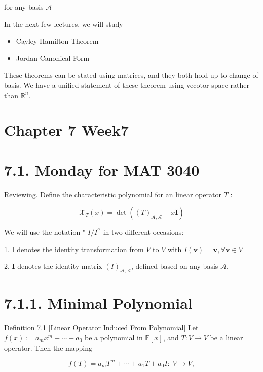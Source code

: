 \documentclass[11pt]{article}
\begin{document}
for any basis \(\mathcal{A}\)

In the next few lectures, we will study

\begin{itemize}
\item Cayley-Hamilton Theorem
\end{itemize}

\begin{itemize}
\item Jordan Canonical Form
\end{itemize}

These theorems can be stated using matrices, and they both hold up to change of basis. We have a unified statement of these theorem using vecotor space rather than \({\mathbb{R}}^n\).


\section*{Chapter 7 Week7}

\section*{7.1. Monday for MAT 3040}

Reviewing. Define the characteristic polynomial for an linear operator \(T\) :

\[
{\mathcal{X}}_{T}\left( x\right)  = \det \left( {{\left( T\right) }_{\mathcal{A},\mathcal{A}} - x\mathbf{I}}\right)
\]

We will use the notation " \(I/{I}^{\prime \prime }\) in two different occasions:

1. I denotes the identity transformation from \(V\) to \(V\) with \(I\left( \mathbf{v}\right)  = \mathbf{v},\forall \mathbf{v} \in  V\)

2. \(\mathbf{I}\) denotes the identity matrix \({\left( I\right) }_{\mathcal{A},\mathcal{A}}\), defined based on any basis \(\mathcal{A}\).

\section*{7.1.1. Minimal Polynomial}

Definition 7.1 [Linear Operator Induced From Polynomial] Let \(f\left( x\right)  \mathrel{\text{ := }} {a}_{m}{x}^{m} + \cdots  + {a}_{0}\) be a polynomial in \(\mathbb{F}\left\lbrack  x\right\rbrack\), and \(T : V \rightarrow  V\) be a linear operator. Then the mapping

\[
f\left( T\right)  = {a}_{m}{T}^{m} + \cdots  + {a}_1T + {a}_{0}I : \;V \rightarrow  V,
\]
\end{document}
